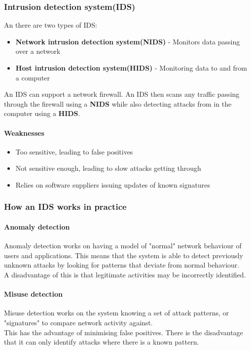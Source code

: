 \documentclass{article}[18pt]
\begin{document}
\subsubsection{Intrusion detection system(IDS)}
An there are two types of IDS:
\begin{itemize}
\item \textbf{Network intrusion detection system(NIDS)} - Monitors data passing over a network
\item \textbf{Host intrusion detection system(HIDS)} - Monitoring data to and from a computer
\end{itemize}
An IDS can support a network firewall. An IDS then scans any traffic passing through the firewall using a \textbf{NIDS} while also detecting attacks from in the computer using a \textbf{HIDS}.
\paragraph{Weaknesses}
\begin{itemize}
\item Too sensitive, leading to false positives
\item Not sensitive enough, leading to slow attacks getting through
\item Relies on software suppliers issuing updates of known signatures
\end{itemize}
\subsubsection{How an IDS works in practice}
\paragraph{Anomaly detection}
Anomaly detection works on having a model of "normal" network behaviour of users and applications. This means that the system is able to detect previously unknown attacks by looking for patterns that deviate from normal behaviour.\\
A disadvantage of this is that legitimate activities may be incorrectly identified.
\paragraph{Misuse detection}
Misuse detection works on the system knowing a set of attack patterns, or "signatures" to compare network activity against.\\
This has the advantage of minimising false positives. There is the disadvantage that it can only identify attacks where there is a known pattern.
\end{document}

